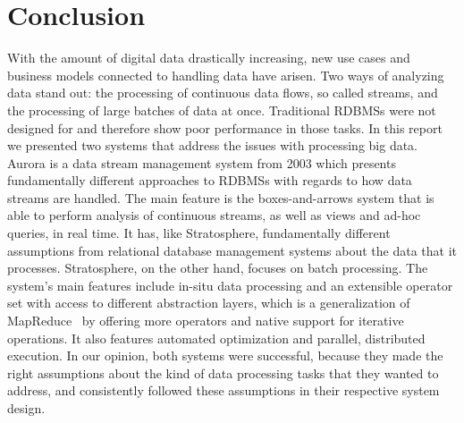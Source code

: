 \section{Conclusion}\label{conclusion}
With the amount of digital data drastically increasing, new use cases and business models connected to handling data have arisen. Two ways of analyzing data stand out: the processing of continuous data flows, so called streams, and the processing of large batches of data at once. Traditional RDBMSs were not designed for and therefore show poor performance in those tasks. In this report we presented two systems that address the issues with processing big data. Aurora is a data stream management system from 2003 which presents fundamentally different approaches to RDBMSs with regards to how data streams are handled. The main feature is the boxes-and-arrows system that is able to perform analysis of continuous streams, as well as views and ad-hoc queries, in real time. It has, like Stratosphere, fundamentally different assumptions from relational database management systems about the data that it processes. Stratosphere, on the other hand, focuses on batch processing. The system's main features include in-situ data processing and an extensible operator set with access to different abstraction layers, which is a generalization of MapReduce~\cite{MapReduce} by offering more operators and native support for iterative operations. It also features automated optimization and parallel, distributed execution. In our opinion, both systems were successful, because they made the right assumptions about the kind of data processing tasks that they wanted to address, and consistently followed these assumptions in their respective system design.